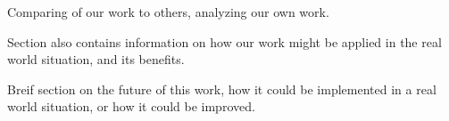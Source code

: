 Comparing of our work to others, analyzing our own work.

Section also contains information on how our work might be applied in the real world situation, and its benefits.

Breif section on the future of this work, how it could be implemented in a real world situation, or how it could be improved.